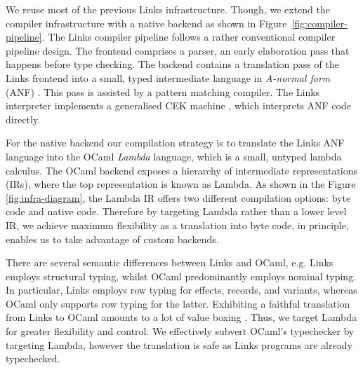 \documentclass[12pt,mscres,cdtppar,twoside,openright,logo,rightchapter,normalheadings]{infthesis}
\theoremstyle{definition}
\begin{document}
We reuse most of the previous Links infrastructure. Though, we extend
the compiler infrastructure with a native backend as shown in
Figure~\ref{fig:compiler-pipeline}. The Links compiler pipeline
follows a rather conventional compiler pipeline design. The frontend
comprises a parser, an early elaboration pass that happens before type
checking. The backend contains a translation pass of the Links
frontend into a small, typed intermediate language in \emph{A-normal
  form} (ANF) \citep{Flanagan1993}. This pass is assisted by a pattern
matching compiler. The Links interpreter implements a generalised CEK
machine \citep{Hillerstrom2016a}, which interprets ANF code directly.

%

For the native backend our compilation strategy is to translate the
Links ANF language into the OCaml \emph{Lambda} language, which is a
small, untyped lambda calculus. The OCaml backend exposes a hierarchy
of intermediate representations (IRs), where the top representation is
known as Lambda. As shown in the Figure \ref{fig:infra-diagram}, the
Lambda IR offers two different compilation options: byte code and
native code. Therefore by targeting Lambda rather than a lower level
IR, we achieve maximum flexibility as a translation into byte code, in
principle, enables us to take advantage of custom backends.

%

There are several semantic differences between Links and OCaml,
e.g. Links employs structural typing, whilst OCaml predominantly
employs nominal typing.  In particular, Links employs row typing for
effects, records, and variants, whereas OCaml only supports row typing
for the latter. Exhibiting a faithful translation from Links to OCaml
amounts to a lot of value boxing \citep{Hol09}. Thus, we target Lambda
for greater flexibility and control.  We effectively subvert OCaml's
typechecker by targeting Lambda, however the translation is safe as
Links programs are already typechecked.


\end{document}
